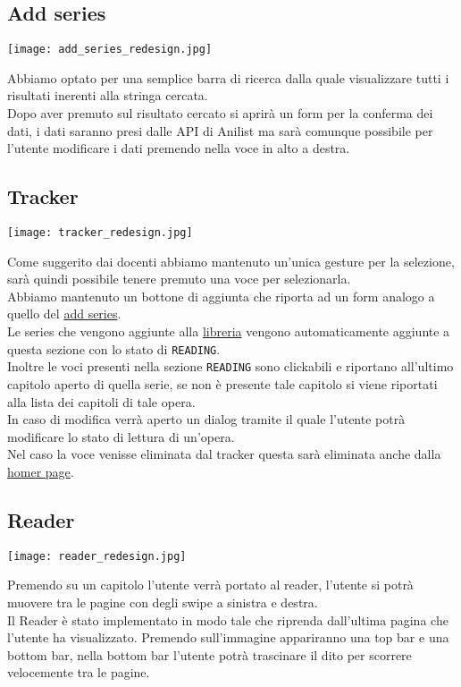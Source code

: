 \documentclass[../Assignment-3-LPSMT.tex]{subfiles}
\begin{document}
\subsection{Add series}\label{sec:add_series_redesign}

\begin{center}
   \texttt{[image: add\_series\_redesign.jpg]}
\end{center}

Abbiamo optato per una semplice barra di ricerca dalla quale visualizzare tutti i risultati inerenti alla stringa cercata.\\
Dopo aver premuto sul risultato cercato si aprirà un form per la conferma dei dati, i dati saranno presi dalle API di Anilist ma sarà comunque possibile per l'utente modificare i dati premendo nella voce in alto a destra.

\subsection{Tracker}

\begin{center}
   \texttt{[image: tracker\_redesign.jpg]}
\end{center}

Come suggerito dai docenti abbiamo mantenuto un'unica gesture per la selezione, sarà quindi possibile tenere premuto una voce per selezionarla.\\
 Abbiamo mantenuto un bottone di aggiunta che riporta ad un form analogo a quello del \hyperref[sec:add_series_redesign]{add series}.\\
 Le series che vengono aggiunte alla \hyperref[sec:home_redesign]{libreria} vengono automaticamente aggiunte a questa sezione con lo stato di \texttt{READING}.\\
 Inoltre le voci presenti nella sezione \texttt{READING} sono clickabili e riportano all'ultimo capitolo aperto di quella serie, se non è presente tale capitolo si viene riportati alla lista dei capitoli di tale opera.\\
 In caso di modifica verrà aperto un dialog tramite il quale l'utente potrà modificare lo stato di lettura di un'opera.\\
 Nel caso la voce venisse eliminata dal tracker questa sarà eliminata anche dalla \hyperref[sec:home_redesign]{homer page}.

\subsection{Reader}

\begin{center}
   \texttt{[image: reader\_redesign.jpg]}
\end{center}

Premendo su un capitolo l'utente verrà portato al reader, l'utente si potrà muovere tra le pagine con degli swipe a sinistra e destra.\\
Il Reader è stato implementato in modo tale che riprenda dall'ultima pagina che l'utente ha visualizzato.
Premendo sull'immagine appariranno una top bar e una bottom bar, nella bottom bar l'utente potrà trascinare il dito per scorrere velocemente tra le pagine.
\end{document}
